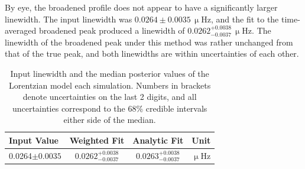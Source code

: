 By eye, the broadened profile does not appear to have a significantly larger linewidth. The input linewidth was $0.0264 \pm 0.0035 \, \upmu\mathrm{Hz} $, and the fit to the time-averaged broadened peak produced a linewidth of $0.0262^{+0.0038}_{-0.0037} \, \upmu\mathrm{Hz} $. The linewidth of the broadened peak under this method was rather unchanged from that of the true peak, and both linewidths are within uncertainties of each other.


\begin{table}[!ht]
	\begin{center}
		\caption{Input linewidth and the median posterior values of the Lorentzian model each simulation. Numbers in brackets denote uncertainties on the last 2 digits, and all uncertainties correspond to the 68\% credible intervals either side of the median.}
		\label{tab:shift_params}
		\begin{tabular}{l c c r}
			\hline
			{\bf Input Value} & {\bf Weighted Fit} & {\bf Analytic Fit} & {\bf Unit} \\
			\hline
			
			
			{0.0264$\pm0.0035$} & {$0.0262^{+0.0038}_{-0.0037}$} & {$0.0263^{+0.0038}_{-0.0037}$} & {$\upmu\mathrm{Hz} $} \\
			
			
			\hline
		\end{tabular}
	\end{center}
\end{table}


